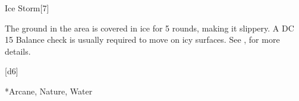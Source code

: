 \begin{spellsection}{Ice Storm}[7]
    \begin{spellheader}
    \end{spellheader}
    \begin{spellcontent}
        \begin{spelltargetinginfo}
        \end{spelltargetinginfo}
        \begin{spelleffects}
            \spelleffect The ground in the area is covered in ice for 5 rounds, making it slippery. A DC 15 Balance check is usually required to move on icy surfaces. See , for more details.
        \end{spelleffects}
    \end{spellcontent}
    \begin{spellsubcontent}
        \begin{spelltargetinginfo}
        \end{spelltargetinginfo}
        \begin{spelleffects}
            \spelleffect {}[d6]
        \end{spelleffects}
    \end{spellsubcontent}
    \begin{spellfooter}
        *{Arcane, Nature, Water}
        \spellnotes \destructivespellnotes
        \miscastyou
    \end{spellfooter}
\end{spellsection}

